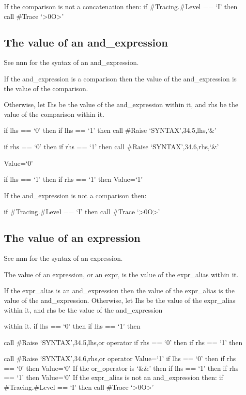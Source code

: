 If the comparison is not a concatenation then: if \#Tracing.\#Level ==
`I' then call \#Trace `\textgreater0O\textgreater{}'

\subsection{The value of an
and\_expression}\label{the-value-of-an-and_expression}

See nnn for the syntax of an and\_expression.

If the and\_expression is a comparison then the value of the
and\_expression is the value of the comparison.

Otherwise, let Ihs be the value of the and\_expression within it, and
rhs be the value of the comparison within it.

if lhs == `0' then if lhs == `1' then call \#Raise
`SYNTAX',34.5,lhs,`\&'

if rhs == `0' then if rhs == `1' then call \#Raise
`SYNTAX',34.6,rhs,`\&'

Value=`0'

if lhs == `1' then if rhs == `1' then Value=`1'

If the and\_expression is not a comparison then:

if \#Tracing.\#Level == `I' then call \#Trace
`\textgreater0O\textgreater{}'

\subsection{The value of an
expression}\label{the-value-of-an-expression}

See nnn for the syntax of an expression.

The value of an expression, or an expr, is the value of the expr\_alias
within it.

If the expr\_alias is an and\_expression then the value of the
expr\_alias is the value of the and\_expression. Otherwise, let Ihs be
the value of the expr\_alias within it, and rhs be the value of the
and\_expression

within it. if lhs == `0' then if lhs == `1' then

call \#Raise `SYNTAX',34.5,lhs,or operator if rhs == `0' then if rhs ==
`1' then

call \#Raise `SYNTAX',34.6,rhs,or operator Value=`1' if lhs == `0' then
if rhs == `0' then Value=`0' If the or\_operator is `\&\&' then if lhs
== `1' then if rhs == `1' then Value=`0' If the expr\_alias is not an
and\_expression then: if \#Tracing.\#Level == `I' then call \#Trace
`\textgreater0O\textgreater{}'

